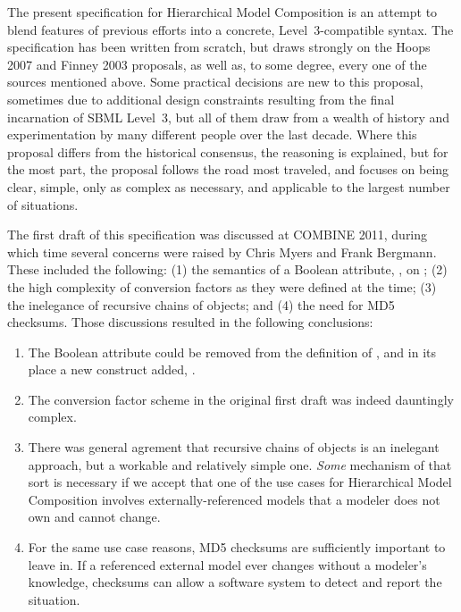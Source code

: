 The present specification for Hierarchical Model Composition is an
attempt to blend features of previous efforts into a concrete,
Level~3-compatible syntax.  The specification has been written from
scratch, but draws strongly on the Hoops 2007 and Finney 2003 proposals,
as well as, to some degree, every one of the sources mentioned above.
Some practical decisions are new to this proposal, sometimes due to
additional design constraints resulting from the final incarnation of
SBML Level~3, but all of them draw from a wealth of history and
experimentation by many different people over the last decade.  Where
this proposal differs from the historical consensus, the reasoning is
explained, but for the most part, the proposal follows the road most
traveled, and focuses on being clear, simple, only as complex as
necessary, and applicable to the largest number of situations.

The first draft of this specification was discussed at COMBINE 2011,
during which time several concerns were raised by Chris Myers and Frank
Bergmann.  These included the following: (1) the semantics of a Boolean
attribute, , on \ReplacedElement; (2) the high
complexity of conversion factors as they were defined at the time; (3)
the inelegance of recursive chains of \SBaseRef objects; and (4) the
need for MD5 checksums.  Those discussions resulted in the following
conclusions:

\begin{enumerate}

\item The Boolean attribute  could be removed from the
  definition of \ReplacedElement, and in its place a new construct
  added, \ReplacedBy.

\item The conversion factor scheme in the original first draft was
  indeed dauntingly complex.

\item There was general agrement that recursive chains of \SBaseRef
  objects is an inelegant approach, but a workable and relatively simple
  one.  \emph{Some} mechanism of that sort is necessary if we accept
  that one of the use cases for Hierarchical Model Composition involves
  externally-referenced models that a modeler does not own and cannot
  change.

\item For the same use case reasons, MD5 checksums are sufficiently
  important to leave in.  If a referenced external model ever changes
  without a modeler's knowledge, checksums can allow a software system
  to detect and report the situation.

\end{enumerate}

